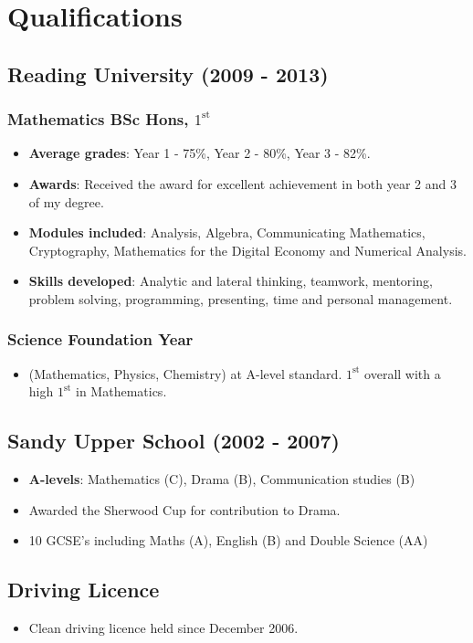 \documentclass[11pt]{article}
\begin{document}
\section*{Qualifications}
\subsection*{Reading University (2009 - 2013)}
\subsubsection*{Mathematics BSc Hons, \(1^{\text{st}}\)}
\begin{itemize}
\item \textbf{Average grades}: Year 1 - 75\%, Year 2 - 80\%, Year 3 - 82\%.
\item \textbf{Awards}: Received the award for excellent achievement in both year 2 and 3 of my degree.
\item \textbf{Modules included}: Analysis, Algebra, Communicating Mathematics, Cryptography, Mathematics for the Digital Economy and Numerical Analysis.
\item \textbf{Skills developed}: Analytic and lateral thinking, teamwork, mentoring, problem solving, programming, presenting, time and personal management.
\end{itemize}
\subsubsection*{Science Foundation Year}
\begin{itemize}
\item (Mathematics, Physics, Chemistry) at A-level standard. \(1^{\text{st}}\) overall with a high \(1^{\text{st}}\) in Mathematics.
\end{itemize}
\subsection*{Sandy Upper School (2002 - 2007)}
\begin{itemize}
\item \textbf{A-levels}: Mathematics (C), Drama (B), Communication studies (B)
\item Awarded the Sherwood Cup for contribution to Drama.
\item 10 GCSE's including Maths (A), English (B) and Double Science (AA) 
\end{itemize}
\subsection*{Driving Licence}
\begin{itemize}
\item Clean driving licence held since December 2006.
\end{itemize}
\end{document}
